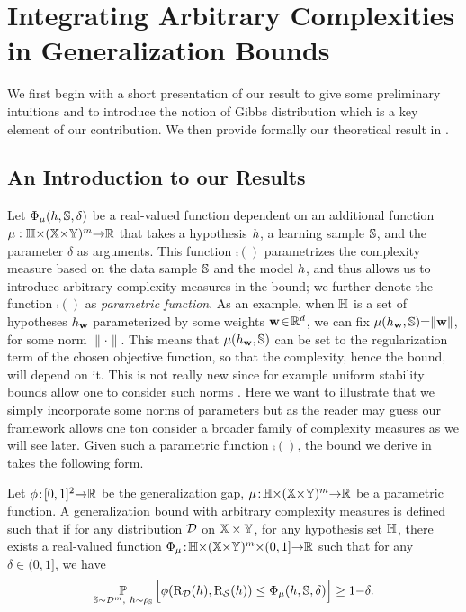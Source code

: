 \section{Integrating Arbitrary Complexities in Generalization Bounds}
\label{chap:dis-mu:sec:contrib} 

We first begin with a short presentation of our result to give some preliminary intuitions and to introduce the notion of Gibbs distribution which is a key element of our contribution.
We then provide formally our theoretical result in .

\subsection{An Introduction to our Results}
\label{chap:dis-mu:sec:def}

Let $\PhiComp(\h, \S, \delta)$ be a real-valued function dependent on an additional function $\comp: \H{\times}(\X{\times}\Y)^\m {\to} \Rbb$ that takes a hypothesis $\h$, a learning sample $\S$, and the parameter $\delta$ as arguments.
This function $\comp()$ parametrizes the complexity measure based on the data sample $\S$ and the model $\h$, and thus allows us to introduce arbitrary complexity measures in the bound; we further denote the function $\comp()$ as {\it parametric function}.
As an example, when $\H$ is a set of hypotheses $\h_\wbf$ parameterized by some weights $\wbf\!\in\!\R^d$, we can fix $\comp(h_{\wbf},\S) {=} \|\wbf\|$, for some norm $\|\cdot\|$. 
This means that $\comp(h_{\wbf},\S)$ can be set to the regularization term of the chosen objective function, so that the complexity, hence the bound, will depend on it.
This is not really new since for example uniform stability bounds allow one to consider such norms \citep[see \eg,][]{KakadeSridharanTewari2008}. 
Here we want to illustrate that we simply incorporate some norms of parameters but as the reader may guess our framework allows one ton consider a broader family of complexity measures as we will see later.
Given such a parametric function $\comp()$, the bound we derive in  takes the following form.

\begin{definition}
\label{chap:dis-mu:def:comp-bound}
Let $\phi\!:\! [0,1]^2{\to}\Rbb$ be the generalization gap, $\comp\!:\! \H{\times}(\X{\times}\Y)^\m {\to} \Rbb$ be a parametric function.
A generalization bound with arbitrary complexity measures is defined such that if for any distribution $\D$ on $\X\times\Y$, for any hypothesis set $\H$, there exists a real-valued function \mbox{$\PhiComp\!:\! \H{\times}(\X{\times}\Y)^\m{\times} (0,1] {\to} \Rbb$} such that for any  $\delta\!\in\!(0, 1]$, we have
\begin{align}
    \PP_{\S\sim\D^\m,\ \h\sim\AQ}\Big[ \phi(\Risk_{\D}(\h), \Risk_{\dS}(\h)) \le \PhiComp(\h, \S, \delta) \Big] \ge 1{-}\delta.\label{chap:dis-mu:eq:comp-bound}
\end{align}
\end{definition}

